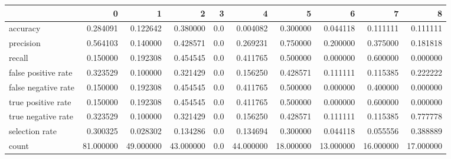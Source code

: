 \begin{tabular}{lrrrrrrrrr}
\toprule
{} &          0 &          1 &          2 &    3 &          4 &          5 &          6 &          7 &          8 \\
\midrule
accuracy            &   0.284091 &   0.122642 &   0.380000 &  0.0 &   0.004082 &   0.300000 &   0.044118 &   0.111111 &   0.111111 \\
precision           &   0.564103 &   0.140000 &   0.428571 &  0.0 &   0.269231 &   0.750000 &   0.200000 &   0.375000 &   0.181818 \\
recall              &   0.150000 &   0.192308 &   0.454545 &  0.0 &   0.411765 &   0.500000 &   0.000000 &   0.600000 &   0.000000 \\
false positive rate &   0.323529 &   0.100000 &   0.321429 &  0.0 &   0.156250 &   0.428571 &   0.111111 &   0.115385 &   0.222222 \\
false negative rate &   0.150000 &   0.192308 &   0.454545 &  0.0 &   0.411765 &   0.500000 &   0.000000 &   0.400000 &   0.000000 \\
true positive rate  &   0.150000 &   0.192308 &   0.454545 &  0.0 &   0.411765 &   0.500000 &   0.000000 &   0.600000 &   0.000000 \\
true negative rate  &   0.323529 &   0.100000 &   0.321429 &  0.0 &   0.156250 &   0.428571 &   0.111111 &   0.115385 &   0.777778 \\
selection rate      &   0.300325 &   0.028302 &   0.134286 &  0.0 &   0.134694 &   0.300000 &   0.044118 &   0.055556 &   0.388889 \\
count               &  81.000000 &  49.000000 &  43.000000 &  0.0 &  44.000000 &  18.000000 &  13.000000 &  16.000000 &  17.000000 \\
\bottomrule
\end{tabular}
